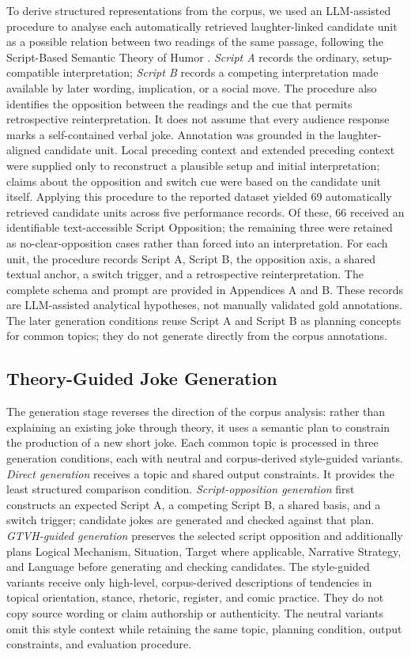 \documentclass[11pt]{article}
\begin{document}
To derive structured representations from the corpus, we used an LLM-assisted procedure to analyse each automatically retrieved laughter-linked candidate unit as a possible relation between two readings of the same passage, following the Script-Based Semantic Theory of Humor \citep{raskin1985}. \emph{Script A} records the ordinary, setup-compatible interpretation; \emph{Script B} records a competing interpretation made available by later wording, implication, or a social move. The procedure also identifies the opposition between the readings and the cue that permits retrospective reinterpretation. It does not assume that every audience response marks a self-contained verbal joke. Annotation was grounded in the laughter-aligned candidate unit. Local preceding context and extended preceding context were supplied only to reconstruct a plausible setup and initial interpretation; claims about the opposition and switch cue were based on the candidate unit itself. Applying this procedure to the reported dataset yielded 69 automatically retrieved candidate units across five performance records. Of these, 66 received an identifiable text-accessible Script Opposition; the remaining three were retained as no-clear-opposition cases rather than forced into an interpretation. For each unit, the procedure records Script A, Script B, the opposition axis, a shared textual anchor, a switch trigger, and a retrospective reinterpretation. The complete schema and prompt are provided in Appendices A and B. These records are LLM-assisted analytical hypotheses, not manually validated gold annotations. The later generation conditions reuse Script A and Script B as planning concepts for common topics; they do not generate directly from the corpus annotations.

\subsection{Theory-Guided Joke Generation}\label{theory-guided-joke-generation}

The generation stage reverses the direction of the corpus analysis: rather than explaining an existing joke through theory, it uses a semantic plan to constrain the production of a new short joke. Each common topic is processed in three generation conditions, each with neutral and corpus-derived style-guided variants. \emph{Direct generation} receives a topic and shared output constraints. It provides the least structured comparison condition. \emph{Script-opposition generation} first constructs an expected Script A, a competing Script B, a shared basis, and a switch trigger; candidate jokes are generated and checked against that plan. \emph{GTVH-guided generation} preserves the selected script opposition and additionally plans Logical Mechanism, Situation, Target where applicable, Narrative Strategy, and Language before generating and checking candidates. The style-guided variants receive only high-level, corpus-derived descriptions of tendencies in topical orientation, stance, rhetoric, register, and comic practice. They do not copy source wording or claim authorship or authenticity. The neutral variants omit this style context while retaining the same topic, planning condition, output constraints, and evaluation procedure.
\end{document}
